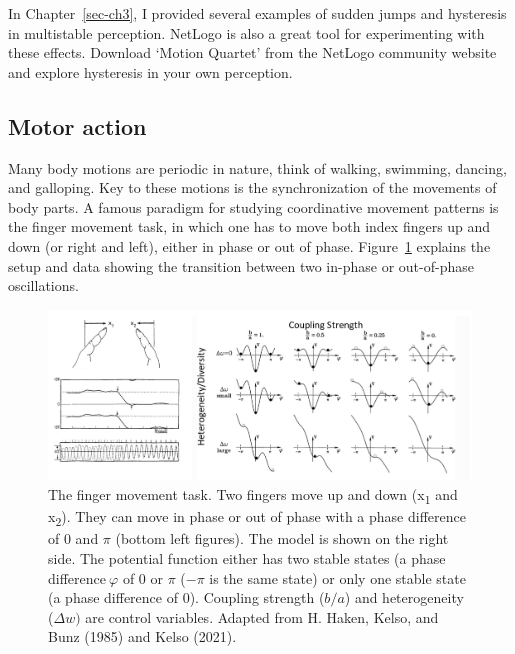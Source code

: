 \documentclass[
  a4paper,
  DIV=11,
  numbers=noendperiod,
  oneside]{scrreprt}
\begin{document}
In Chapter~\ref{sec-ch3}, I provided several examples of sudden jumps
and hysteresis in multistable perception. NetLogo is also a great tool
for experimenting with these effects. Download `Motion Quartet' from the
NetLogo community website and explore hysteresis in your own perception.

\hypertarget{sec-Motor-action}{%
\subsection{Motor action}\label{sec-Motor-action}}

Many body motions are periodic in nature, think of walking, swimming,
dancing, and galloping. Key to these motions is the synchronization of
the movements of body parts. A famous paradigm for studying coordinative
movement patterns is the finger movement task, in which one has to move
both index fingers up and down (or right and left), either in phase or
out of phase. Figure~\ref{fig-ch5n-img7-old-45} explains the setup and
data showing the transition between two in-phase or out-of-phase
oscillations.

\begin{figure}

{\centering \includegraphics{media/ch5n/image7.jpg}

}

\caption{\label{fig-ch5n-img7-old-45}The finger movement task. Two
fingers move up and down (x\textsubscript{1} and x\textsubscript{2}).
They can move in phase or out of phase with a phase difference of 0 and
\(\pi\) (bottom left figures). The model is shown on the right side. The
potential function either has two stable states (a phase
difference\(\ \varphi\) of 0 or \(\pi\) (\(- \pi\) is the same state) or
only one stable state (a phase difference of 0). Coupling strength
(\(b/a\)) and heterogeneity (\(\Delta w)\) are control variables.
Adapted from H. Haken, Kelso, and Bunz (1985) and Kelso (2021).}

\end{figure}
\end{document}
